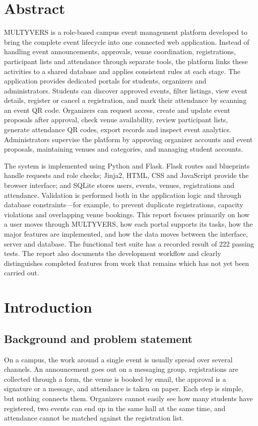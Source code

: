 \documentclass[11pt,a4paper]{article}
\begin{document}
\section*{Abstract}
MULTYVERS is a role-based campus event management platform developed to bring the
complete event lifecycle into one connected web application. Instead of handling event
announcements, approvals, venue coordination, registrations, participant lists and attendance
through separate tools, the platform links these activities to a shared database and applies
consistent rules at each stage. The application provides dedicated portals for students,
organizers and administrators. Students can discover approved events, filter listings, view event
details, register or cancel a registration, and mark their attendance by scanning an event QR
code. Organizers can request access, create and update event proposals after approval, check
venue availability, review participant lists, generate attendance QR codes, export records and
inspect event analytics. Administrators supervise the platform by approving organizer accounts
and event proposals, maintaining venues and categories, and managing student accounts.

The system is implemented using Python and Flask. Flask routes and blueprints handle requests
and role checks; Jinja2, HTML, CSS and JavaScript provide the browser interface; and SQLite
stores users, events, venues, registrations and attendance. Validation is performed both in the
application logic and through database constraints—for example, to prevent duplicate
registrations, capacity violations and overlapping venue bookings. This report focuses primarily
on how a user moves through MULTYVERS, how each portal supports its tasks, how the major
features are implemented, and how the data moves between the interface, server and database.
The functional test suite has a recorded result of 222 passing tests. The report also documents
the development workflow and clearly distinguishes completed features from work that remains which has not yet been carried out.

\section{Introduction}

\subsection{Background and problem statement}
On a campus, the work around a single event is usually spread over several channels. An
announcement goes out on a messaging group, registrations are collected through a form,
the venue is booked by email, the approval is a signature or a message, and attendance is
taken on paper. Each step is simple, but nothing connects them. Organizers cannot easily see how many
students have registered, two events can end up in the same hall at the same time, and
attendance cannot be matched against the registration list.
\end{document}
